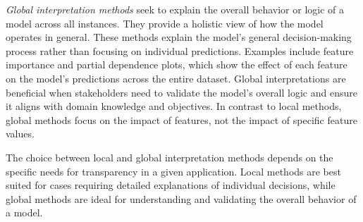 \emph{Global interpretation methods} seek to explain the overall behavior or logic of a model across all instances. They provide a holistic view of how the model operates in general. These methods explain the model's general decision-making process rather than focusing on individual predictions. Examples include feature importance and partial dependence plots, which show the effect of each feature on the model's predictions across the entire dataset. Global interpretations are beneficial when stakeholders need to validate the model's overall logic and ensure it aligns with domain knowledge and objectives. In contrast to local methods, global methods focus on the impact of features, not the impact of specific feature values.

The choice between local and global interpretation methods depends on the specific needs for transparency in a given application. Local methods are best suited for cases requiring detailed explanations of individual decisions, while global methods are ideal for understanding and validating the overall behavior of a model. 





